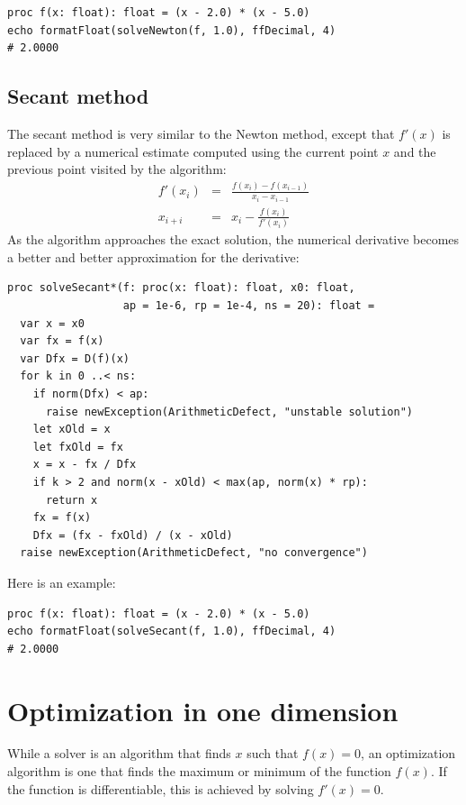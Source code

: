 \documentclass[justified, sixbynine]{tufte-book}
\def\ft{\small\tt}
\theoremstyle{plain}%
\newtheorem * {corollary}{Corollary}
\theoremstyle{definition}
\theoremstyle{remark}
\newtheorem * {remark}{Remark}
\newtheorem * {note}{Note}
\begin{document}
\begin{fullwidth}
\begin{lstlisting}
proc f(x: float): float = (x - 2.0) * (x - 5.0)
echo formatFloat(solveNewton(f, 1.0), ffDecimal, 4)
# 2.0000
\end{lstlisting}

\goodbreak\subsection{Secant method}


The secant method is very similar to the Newton method, except that $f'(x)$ is replaced by a numerical estimate computed using the current point $x$ and the previous point visited by the algorithm:
\begin{eqnarray}
f'(x_i) &=& \frac{f(x_i)-f(x_{i-1})}{x_i-x_{i-1}} \\
x_{i+i} &=& x_i - \frac{f(x_i)}{f'(x_i)}
\end{eqnarray}
As the algorithm approaches the exact solution, the numerical derivative becomes a better and better approximation for the derivative:

\begin{lstlisting}[caption={in file: {\ft nlib/solvers.nim}}]
proc solveSecant*(f: proc(x: float): float, x0: float,
                  ap = 1e-6, rp = 1e-4, ns = 20): float =
  var x = x0
  var fx = f(x)
  var Dfx = D(f)(x)
  for k in 0 ..< ns:
    if norm(Dfx) < ap:
      raise newException(ArithmeticDefect, "unstable solution")
    let xOld = x
    let fxOld = fx
    x = x - fx / Dfx
    if k > 2 and norm(x - xOld) < max(ap, norm(x) * rp):
      return x
    fx = f(x)
    Dfx = (fx - fxOld) / (x - xOld)
  raise newException(ArithmeticDefect, "no convergence")
\end{lstlisting}

Here is an example:

\begin{lstlisting}
proc f(x: float): float = (x - 2.0) * (x - 5.0)
echo formatFloat(solveSecant(f, 1.0), ffDecimal, 4)
# 2.0000
\end{lstlisting}

\goodbreak\section{Optimization in one dimension}


While a solver is an algorithm that finds $x$ such that $f(x)=0$, an optimization algorithm is one that finds the maximum or minimum of the function $f(x)$. If the function is differentiable, this is achieved by solving $f'(x)=0$.


\end{fullwidth}
\end{document}

